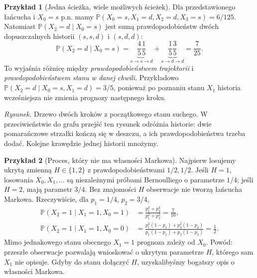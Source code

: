 \documentclass[11pt,a4paper,oneside]{report}
\numberwithin{equation}{chapter}
\theoremstyle{plain}
\theoremstyle{definition}
\newtheorem{przyklad}{Przykład}[chapter]
\theoremstyle{remark}
\newcommand{\Prob}{\mathbb{P}}
\begin{document}
\begin{przyklad}[Jedna ścieżka, wiele możliwych ścieżek]
Dla przedstawionego łańcucha i $X_0=s$ p.n. mamy
$\Prob(X_0=s,X_1=d,X_2=d,X_3=s)=6/125$.
Natomiast $\Prob(X_2=d\mid X_0=s)$ jest sumą
prawdopodobieństw dwóch dopuszczalnych historii
$(s,s,d)$ i $(s,d,d)$:
\[
\Prob(X_2=d\mid X_0=s)
=\underbrace{\frac45\frac15}_{s\to s\to d}
+\underbrace{\frac15\frac35}_{s\to d\to d}
=\frac7{25}.
\]
To wyjaśnia różnicę między \emph{prawdopodobieństwem
trajektorii} i \emph{prawdopodobieństwem stanu w danej chwili}.
Przykładowo
$\Prob(X_2=d\mid X_0=s,X_1=d)=3/5$,
ponieważ po poznaniu stanu $X_1$ historia wcześniejsza
nie zmienia prognozy następnego kroku.
\end{przyklad}


\begin{center}

{\small\emph{Rysunek.} Drzewo dwóch kroków z początkowego stanu suchego.
W przeciwieństwie do grafu przejść ten rysunek odróżnia
historie: dwie pomarańczowe strzałki kończą się w deszczu,
a ich prawdopodobieństwa trzeba dodać.
Kolejne krawędzie jednej historii mnożymy.}
\end{center}

\begin{przyklad}[Proces, który nie ma własności Markowa]
Najpierw losujemy ukrytą zmienną $H\in\{1,2\}$
z prawdopodobieństwami $1/2,1/2$. Jeśli $H=1$,
losowania $X_0,X_1,\ldots$ są niezależnymi próbami
Bernoulliego o parametrze $1/4$; jeśli $H=2$,
mają parametr $3/4$. Bez znajomości $H$
obserwacje nie tworzą łańcucha Markowa.
Rzeczywiście, dla $p_1=1/4$, $p_2=3/4$,
\begin{align*}
\Prob(X_2=1\mid X_1=1,X_0=1)
&=\frac{p_1^3+p_2^3}{p_1^2+p_2^2}=\frac7{10},\\
\Prob(X_2=1\mid X_1=1,X_0=0)
&=\frac{p_1^2(1-p_1)+p_2^2(1-p_2)}
{p_1(1-p_1)+p_2(1-p_2)}=\frac12.
\end{align*}
Mimo jednakowego stanu obecnego $X_1=1$ prognoza
zależy od $X_0$. Powód: przeszłe obserwacje
pozwalają wnioskować o ukrytym parametrze $H$,
którego sam $X_1$ nie opisuje. Gdyby do stanu
dołączyć $H$, uzyskalibyśmy bogatszy opis o własności Markowa.
\end{przyklad}
\end{document}

